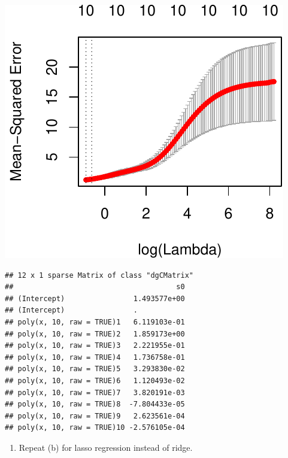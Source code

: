 \documentclass[]{article}
\newenvironment{Shaded}{\begin{snugshade}}{\end{snugshade}}
\newcommand{\DataTypeTok}[1]{\textcolor[rgb]{0.13,0.29,0.53}{#1}}
\newcommand{\DecValTok}[1]{\textcolor[rgb]{0.00,0.00,0.81}{#1}}
\newcommand{\KeywordTok}[1]{\textcolor[rgb]{0.13,0.29,0.53}{\textbf{#1}}}
\newcommand{\NormalTok}[1]{#1}
\newcommand{\OperatorTok}[1]{\textcolor[rgb]{0.81,0.36,0.00}{\textbf{#1}}}
\newcommand{\StringTok}[1]{\textcolor[rgb]{0.31,0.60,0.02}{#1}}
\providecommand{\tightlist}{%
  \setlength{\itemsep}{0pt}\setlength{\parskip}{0pt}}
\begin{document}
\begin{center}\includegraphics{sol_A4_files/figure-latex/unnamed-chunk-16-2} \end{center}

\begin{Shaded}
\end{Shaded}

\begin{verbatim}
## 12 x 1 sparse Matrix of class "dgCMatrix"
##                                      s0
## (Intercept)                1.493577e+00
## (Intercept)                .           
## poly(x, 10, raw = TRUE)1   6.119103e-01
## poly(x, 10, raw = TRUE)2   1.859173e+00
## poly(x, 10, raw = TRUE)3   2.221955e-01
## poly(x, 10, raw = TRUE)4   1.736758e-01
## poly(x, 10, raw = TRUE)5   3.293830e-02
## poly(x, 10, raw = TRUE)6   1.120493e-02
## poly(x, 10, raw = TRUE)7   3.820191e-03
## poly(x, 10, raw = TRUE)8  -7.804433e-05
## poly(x, 10, raw = TRUE)9   2.623561e-04
## poly(x, 10, raw = TRUE)10 -2.576105e-04
\end{verbatim}

\begin{enumerate}
\def\labelenumi{(\alph{enumi})}
\setcounter{enumi}{2}
\tightlist
\item
  Repeat (b) for lasso regression instead of ridge.
\end{enumerate}
\end{document}
